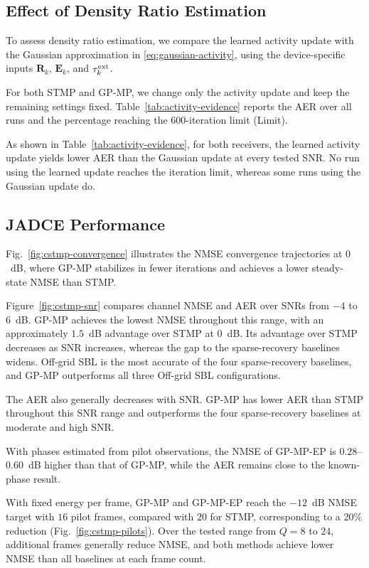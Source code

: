 \subsection{Effect of Density Ratio Estimation}
\label{sec:activity-evidence}
To assess density ratio estimation, we compare the learned activity
update with the Gaussian approximation in \eqref{eq:gaussian-activity},
using the device-specific inputs $\mathbf R_k$, $\mathbf E_k$, and
$\tau_k^{\rm ext}$.

For both STMP and GP-MP, we change only the activity update and keep
the remaining settings fixed. Table~\ref{tab:activity-evidence} reports
the AER over
all runs and the percentage reaching the $600$-iteration limit (Limit).

As shown in Table~\ref{tab:activity-evidence}, for both receivers, the
learned activity update yields lower AER than the Gaussian update at
every tested SNR. No run using the learned update reaches the iteration
limit, whereas some runs using the Gaussian update do.

\subsection{JADCE Performance}
\label{sec:jadce-performance}
Fig.~\ref{fig:cstmp-convergence} illustrates the NMSE convergence
trajectories at $0$~dB, where GP-MP stabilizes in fewer iterations
and achieves a lower steady-state NMSE than STMP.

Figure~\ref{fig:cstmp-snr} compares channel NMSE and AER over SNRs
from $-4$ to $6$~dB. GP-MP achieves the lowest NMSE throughout this
range, with an approximately $1.5$~dB advantage over STMP at $0$~dB.
Its advantage over STMP decreases as SNR increases, whereas the gap
to the sparse-recovery baselines widens. Off-grid SBL is the most
accurate of the four sparse-recovery baselines, and GP-MP outperforms
all three Off-grid SBL configurations.

The AER also generally decreases with SNR. GP-MP has lower AER than
STMP throughout this SNR range and outperforms the four sparse-recovery
baselines at moderate and high SNR.

With phases estimated from pilot observations, the NMSE of GP-MP-EP
is $0.28$--$0.60$~dB higher than that of GP-MP, while the AER remains
close to the known-phase result.

With fixed energy per frame, GP-MP and GP-MP-EP reach the $-12$~dB
NMSE target with $16$ pilot frames, compared with $20$ for STMP,
corresponding to a $20\%$ reduction (Fig.~\ref{fig:cstmp-pilots}).
Over the tested range from $Q=8$ to $24$, additional frames generally
reduce NMSE, and both methods achieve lower NMSE than all baselines
at each frame count.

